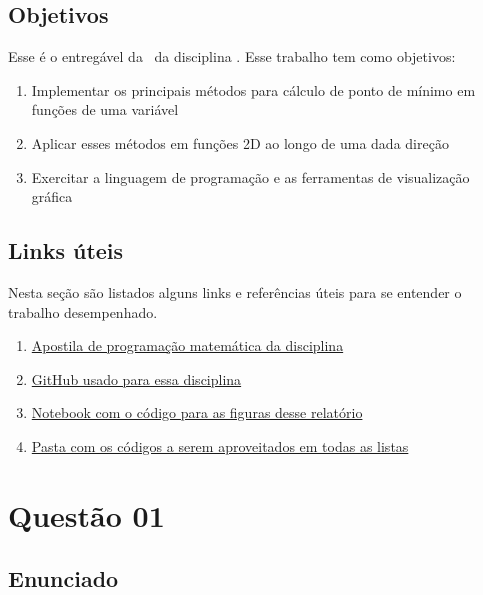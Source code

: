 \documentclass[10pt, a4paper]{article}
\begin{document}
\subsection{Objetivos}

Esse é o entregável da \TITLE \ da disciplina \DISCIPLINE. Esse trabalho tem como objetivos:

\begin{enumerate}
  \item Implementar os principais métodos para cálculo de ponto de mínimo em funções de uma variável
  \item Aplicar esses métodos em funções 2D ao longo de uma dada direção
  \item Exercitar a linguagem de programação e as ferramentas de visualização gráfica
\end{enumerate}

\subsection{Links úteis}\label{links}

Nesta seção são listados alguns links e referências úteis para se entender o trabalho desempenhado.

\begin{enumerate}
  \item \href{https://web.tecgraf.puc-rio.br/~ivan/MEC2403/ProgMatematica_VazPereiraMenezes-Ago2012.pdf}{Apostila de programação matemática da disciplina}
  \item \href{https://github.com/prj-phcp/MEC2403_Activities}{GitHub usado para essa disciplina}
  \item \href{https://github.com/prj-phcp/MEC2403_Activities/blob/master/Lista1/Lista2.ipynb}{Notebook com o código para as figuras desse relatório}
  \item \href{https://github.com/prj-phcp/MEC2403_Activities/blob/master/packages}{Pasta com os códigos a serem aproveitados em todas as listas}
\end{enumerate}

\section{Questão 01}\label{sec:q01}

\subsection{Enunciado}
\end{document}

